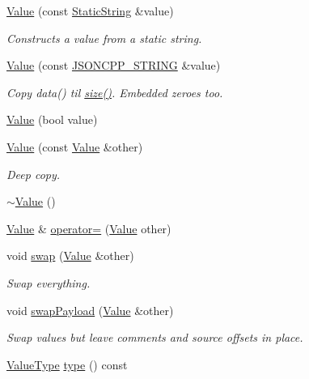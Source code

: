 \begin{DoxyCompactItemize}
\hyperlink{class_json_1_1_value_a081830e95f88a37054da7e46c65b0766}{Value} (const \hyperlink{class_json_1_1_static_string}{Static\+String} \&value)
\begin{DoxyCompactList}\small\item\em Constructs a value from a static string. \end{DoxyCompactList}\item 
\hyperlink{class_json_1_1_value_a89ef37969ff7c6eb3a7afcca03d4cd4a}{Value} (const \hyperlink{json_8h_a1e723f95759de062585bc4a8fd3fa4be}{J\+S\+O\+N\+C\+P\+P\+\_\+\+S\+T\+R\+I\+NG} \&value)
\begin{DoxyCompactList}\small\item\em Copy data() til \hyperlink{class_json_1_1_value_a0ec2808e1d7efa4e9fad938d6667be44}{size()}. Embedded zeroes too. \end{DoxyCompactList}\item 
\hyperlink{class_json_1_1_value_a350a31ea4a30d384994b0bc010b17495}{Value} (bool value)
\item 
\hyperlink{class_json_1_1_value_a436dfd3670f95fd665f680eba5cebcf0}{Value} (const \hyperlink{class_json_1_1_value}{Value} \&other)
\begin{DoxyCompactList}\small\item\em Deep copy. \end{DoxyCompactList}\item 
\hyperlink{class_json_1_1_value_a287dea48da3912d02756735bf677b27b}{$\sim$\+Value} ()
\item 
\hyperlink{class_json_1_1_value}{Value} \& \hyperlink{class_json_1_1_value_a795acb28772da4c5d85ae8f4af36c69f}{operator=} (\hyperlink{class_json_1_1_value}{Value} other)
\item 
void \hyperlink{class_json_1_1_value_aab841120d78e296e1bc06a373345e822}{swap} (\hyperlink{class_json_1_1_value}{Value} \&other)
\begin{DoxyCompactList}\small\item\em Swap everything. \end{DoxyCompactList}\item 
void \hyperlink{class_json_1_1_value_a5263476047f20e2fc6de470e4de34fe5}{swap\+Payload} (\hyperlink{class_json_1_1_value}{Value} \&other)
\begin{DoxyCompactList}\small\item\em Swap values but leave comments and source offsets in place. \end{DoxyCompactList}\item 
\hyperlink{namespace_json_a7d654b75c16a57007925868e38212b4e}{Value\+Type} \hyperlink{class_json_1_1_value_a8ce61157a011894f0252ceed232312de}{type} () const

\end{DoxyCompactItemize}
